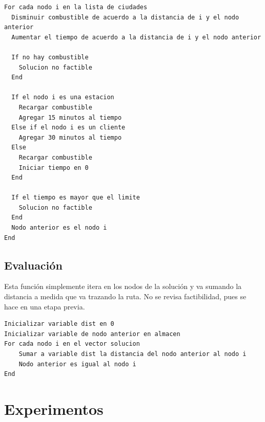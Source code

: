 \documentclass[letter, 10pt]{article}
\begin{document}
\begin{lstlisting}[frame = single]
For cada nodo i en la lista de ciudades
  Disminuir combustible de acuerdo a la distancia de i y el nodo anterior
  Aumentar el tiempo de acuerdo a la distancia de i y el nodo anterior

  If no hay combustible
    Solucion no factible
  End

  If el nodo i es una estacion
    Recargar combustible
    Agregar 15 minutos al tiempo
  Else if el nodo i es un cliente
    Agregar 30 minutos al tiempo
  Else
    Recargar combustible
    Iniciar tiempo en 0
  End
  
  If el tiempo es mayor que el limite
    Solucion no factible
  End
  Nodo anterior es el nodo i
End
\end{lstlisting}

\subsection{Evaluación}
Esta función simplemente itera en los nodos de la solución y va sumando la distancia a medida que va trazando la ruta. No se revisa factibilidad, pues se hace en una etapa previa.

\begin{lstlisting}[frame = single]
Inicializar variable dist en 0
Inicializar variable de nodo anterior en almacen
For cada nodo i en el vector solucion
	Sumar a variable dist la distancia del nodo anterior al nodo i
	Nodo anterior es igual al nodo i
End
\end{lstlisting}

\newpage
\section{Experimentos}
\end{document}

